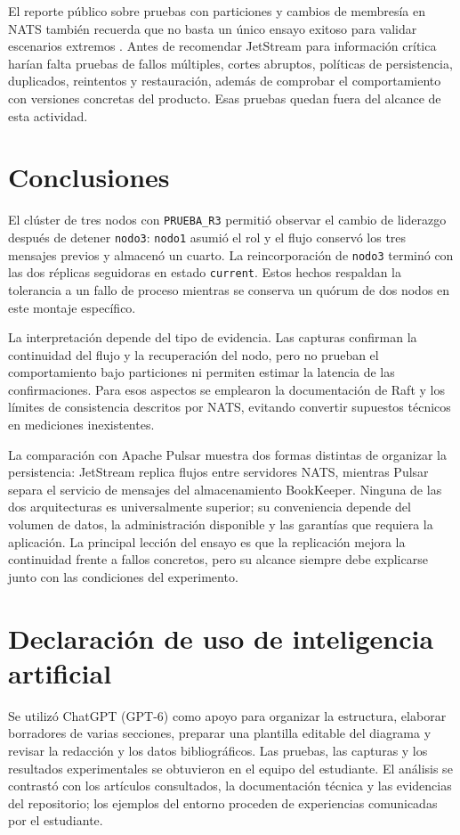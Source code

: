 \documentclass[12pt,a4paper]{article}
\begin{document}
El reporte público sobre pruebas con particiones y cambios de membresía en NATS también recuerda que no basta un único ensayo exitoso para validar escenarios extremos \cite{natsincident2025}. Antes de recomendar JetStream para información crítica harían falta pruebas de fallos múltiples, cortes abruptos, políticas de persistencia, duplicados, reintentos y restauración, además de comprobar el comportamiento con versiones concretas del producto. Esas pruebas quedan fuera del alcance de esta actividad.

\section{Conclusiones}
El clúster de tres nodos con \texttt{PRUEBA\_R3} permitió observar el cambio de liderazgo después de detener \texttt{nodo3}: \texttt{nodo1} asumió el rol y el flujo conservó los tres mensajes previos y almacenó un cuarto. La reincorporación de \texttt{nodo3} terminó con las dos réplicas seguidoras en estado \texttt{current}. Estos hechos respaldan la tolerancia a un fallo de proceso mientras se conserva un quórum de dos nodos en este montaje específico.

La interpretación depende del tipo de evidencia. Las capturas confirman la continuidad del flujo y la recuperación del nodo, pero no prueban el comportamiento bajo particiones ni permiten estimar la latencia de las confirmaciones. Para esos aspectos se emplearon la documentación de Raft y los límites de consistencia descritos por NATS, evitando convertir supuestos técnicos en mediciones inexistentes.

La comparación con Apache Pulsar muestra dos formas distintas de organizar la persistencia: JetStream replica flujos entre servidores NATS, mientras Pulsar separa el servicio de mensajes del almacenamiento BookKeeper. Ninguna de las dos arquitecturas es universalmente superior; su conveniencia depende del volumen de datos, la administración disponible y las garantías que requiera la aplicación. La principal lección del ensayo es que la replicación mejora la continuidad frente a fallos concretos, pero su alcance siempre debe explicarse junto con las condiciones del experimento.

\section*{Declaración de uso de inteligencia artificial}
Se utilizó ChatGPT (GPT-6) como apoyo para organizar la estructura, elaborar borradores de varias secciones, preparar una plantilla editable del diagrama y revisar la redacción y los datos bibliográficos. Las pruebas, las capturas y los resultados experimentales se obtuvieron en el equipo del estudiante. El análisis se contrastó con los artículos consultados, la documentación técnica y las evidencias del repositorio; los ejemplos del entorno proceden de experiencias comunicadas por el estudiante.
\end{document}

